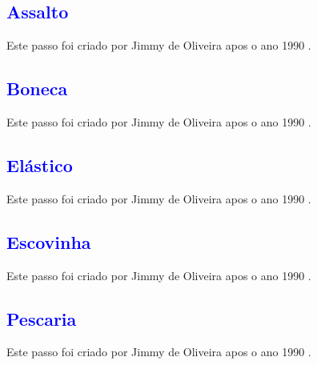
\subsection{\textcolor{blue}{Assalto}} 
Este passo foi criado por Jimmy de Oliveira apos o ano 1990 \cite{sambafunkeadoJimmyDeOliveiraPart1}.

\subsection{\textcolor{blue}{Boneca}} 
Este passo foi criado por Jimmy de Oliveira apos o ano 1990 \cite{sambafunkeadoJimmyDeOliveiraPart1}.

\subsection{\textcolor{blue}{Elástico}} 
Este passo foi criado por Jimmy de Oliveira apos o ano 1990 \cite{sambafunkeadoJimmyDeOliveiraPart1}.

\subsection{\textcolor{blue}{Escovinha}}
Este passo foi criado por Jimmy de Oliveira apos o ano 1990 \cite{sambafunkeadoJimmyDeOliveiraPart1}.


\subsection{\textcolor{blue}{Pescaria}} 
Este passo foi criado por Jimmy de Oliveira apos o ano 1990 \cite{sambafunkeadoJimmyDeOliveiraPart1}.

